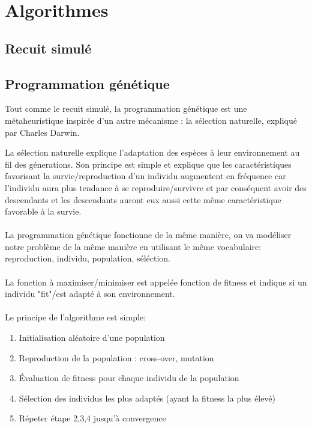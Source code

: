 \documentclass{report}
\begin{document}
\chapter{Algorithmes}

\section{Recuit simulé}

\section{Programmation génétique}

Tout comme le recuit simulé, la programmation génétique est une
métaheuristique inspirée d'un autre mécanisme : la sélection
naturelle, expliqué par Charles Darwin.

La sélection naturelle explique l'adaptation des espèces à leur
environnement au fil des génerations. Son principe est simple et
explique que les caractéristiques favorisant la survie/reproduction
d'un individu augmentent en fréquence car l'individu aura plus
tendance à se reproduire/survivre et par conséquent avoir des
descendants et les descendants auront eux aussi cette même
caractéristique favorable à la survie.\\\\

La programmation génétique fonctionne de la même manière, on va
modéliser notre problème de la même manière en utilisant le même
vocabulaire: reproduction, individu, population, séléction.\\\\

La fonction à maximiser/minimiser est appelée fonction de fitness et
indique si un individu "fit"/est adapté à son environnement.\\\\

Le principe de l'algorithme est simple:
\begin{enumerate}
\item Initialisation aléatoire d'une population
\item Reproduction de la population : cross-over, mutation
\item \'Evaluation de fitness pour chaque individu de la population
\item Sélection des individus les plus adaptés (ayant la fitness la plus élevé)
\item Répeter étape 2,3,4 jusqu'à convergence
\end{enumerate}
\end{document}
